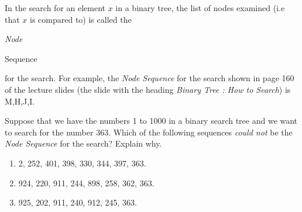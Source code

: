 In the search for an element $x$ in a binary tree, the list of nodes
examined (i.e that $x$ is compared to) is called the {\em Node

Sequence} for the search. For example, the {\em Node Sequence} for the
search shown in page 160 of the lecture slides (the slide with the
heading {\em Binary Tree : How to Search}) is M,H,J,I.

Suppose that we have the numbers 1 to 1000 in a binary search tree and
we want to search for the number 363. Which of the following sequences
{\it could not} be the {\em Node Sequence} for the search? Explain why.

\begin{enumerate}
\item  2, 252, 401, 398, 330, 344, 397, 363.
\item  924, 220, 911, 244, 898, 258, 362, 363.
\item  925, 202, 911, 240, 912, 245, 363.
\end{enumerate}
